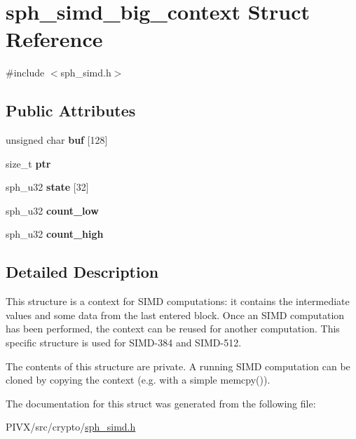 \hypertarget{structsph__simd__big__context}{}\section{sph\+\_\+simd\+\_\+big\+\_\+context Struct Reference}
\label{structsph__simd__big__context}


{\ttfamily \#include $<$sph\+\_\+simd.\+h$>$}

\subsection*{Public Attributes}
\begin{DoxyCompactItemize}
\item 
\mbox{\label{structsph__simd__big__context_a4d67b9491c7243d7e372de7ca01a717f}} 
unsigned char {\bfseries buf} \mbox{[}128\mbox{]}
\item 
\mbox{\label{structsph__simd__big__context_a0f5cd2f56abcf6ab9e0a6177e970814f}} 
size\+\_\+t {\bfseries ptr}
\item 
\mbox{\label{structsph__simd__big__context_ac1948fd0308eb6281db68aaa9ee4178e}} 
sph\+\_\+u32 {\bfseries state} \mbox{[}32\mbox{]}
\item 
\mbox{\label{structsph__simd__big__context_a0869d428ed186efa3137783052da74d4}} 
sph\+\_\+u32 {\bfseries count\+\_\+low}
\item 
\mbox{\label{structsph__simd__big__context_ae7c05aa3d59f60bd4d06b6abe04e7a7b}} 
sph\+\_\+u32 {\bfseries count\+\_\+high}
\end{DoxyCompactItemize}


\subsection{Detailed Description}
This structure is a context for S\+I\+MD computations\+: it contains the intermediate values and some data from the last entered block. Once an S\+I\+MD computation has been performed, the context can be reused for another computation. This specific structure is used for S\+I\+M\+D-\/384 and S\+I\+M\+D-\/512.

The contents of this structure are private. A running S\+I\+MD computation can be cloned by copying the context (e.\+g. with a simple {\ttfamily memcpy()}). 

The documentation for this struct was generated from the following file\+:\begin{DoxyCompactItemize}
\item 
P\+I\+V\+X/src/crypto/\mbox{\hyperlink{sph__simd_8h}{sph\+\_\+simd.\+h}}\end{DoxyCompactItemize}
